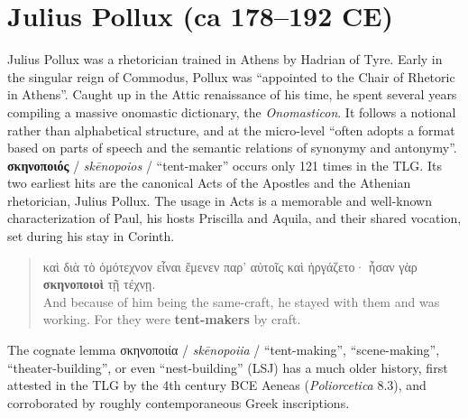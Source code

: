 %
%
\chapter{Julius Pollux (ca 178--192 CE)}%
\justifying%
\vspace*{3mm}%
%
\noindent{}Julius Pollux was a rhetorician trained in Athens %
by Hadrian of Tyre. %
Early in the singular reign of Commodus, %
Pollux was “appointed to the Chair of Rhetoric in Athens”. %
Caught up in the Attic renaissance of his time, %
he spent several years compiling a massive onomastic dictionary, the \textit{Onomasticon}. %
It follows a notional rather than alphabetical structure, %
and at the micro-level “often adopts a format based on parts of speech and %
the semantic relations of synonymy and antonymy”. \\[1mm] %

\noindent{}\textbf{σκηνοποιός} / \textit{skēnopoios} / “tent-maker” %
occurs only 121 times in the TLG. Its two earliest hits are the canonical Acts of the Apostles %
and the Athenian rhetorician, Julius Pollux. %
The usage in Acts is a memorable and well-known characterization of Paul, %
his hosts Priscilla and Aquila, and their shared vocation, %
set during his stay in Corinth. %

\vspace*{2mm} 
 \begin{quote}καὶ διὰ τὸ ὁμότεχνον εἶναι ἔμενεν παρ’ αὐτοῖς καὶ ἠργάζετο· %
 ἦσαν γὰρ \textbf{σκηνοποιοὶ} τῇ τέχνῃ. \\[1mm] %
 And because of him being the same-craft, he stayed with them and was working. %
 For they were \textbf{tent-makers} by craft. \end{quote} %
 \vspace*{2mm}

\noindent{}The cognate lemma σκηνοποιία / \textit{skēnopoiia} / “tent-making”, “scene-making”, “theater-building”, %
or even “nest-building” (LSJ) has a much older history, %
first attested in the TLG by the 4th century BCE Aeneas (\textit{Poliorcetica} 8.3), %
and corroborated by roughly contemporaneous Greek inscriptions.

